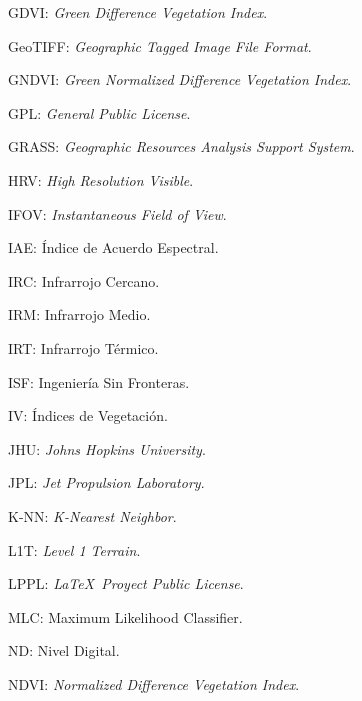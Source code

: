 GDVI: \textit{Green Difference Vegetation Index}.

GeoTIFF: \textit{Geographic Tagged Image File Format}.

GNDVI: \textit{Green Normalized Difference Vegetation Index}.

GPL: \textit{General Public License}.

GRASS: \textit{Geographic Resources Analysis Support System}.

HRV: \textit{High Resolution Visible}.

IFOV: \textit{Instantaneous Field of View}.

IAE: Índice de Acuerdo Espectral.

IRC: Infrarrojo Cercano.

IRM: Infrarrojo Medio.

IRT: Infrarrojo Térmico.

ISF: Ingeniería Sin Fronteras.

IV: Índices de Vegetación.

JHU: \textit{Johns Hopkins University}.

JPL: \textit{Jet Propulsion Laboratory}.

K-NN: \textit{K-Nearest Neighbor}.

L1T: \textit{Level 1 Terrain}.

LPPL: \textit{\LaTeX\ Proyect Public License}.

MLC: Maximum Likelihood Classifier.

ND: Nivel Digital.

NDVI: \textit{Normalized Difference Vegetation Index}.

